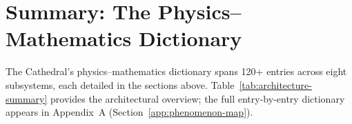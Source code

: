 \documentclass[11pt,a4paper]{article}
\begin{document}































\section{Summary: The Physics--Mathematics Dictionary}
\label{sec:summary}

The Cathedral's physics--mathematics dictionary spans 120+ entries
across eight subsystems, each detailed in the sections above.
Table~\ref{tab:architecture-summary} provides the architectural
overview; the full entry-by-entry dictionary appears in
Appendix~A (Section~\ref{app:phenomenon-map}).
\end{document}
